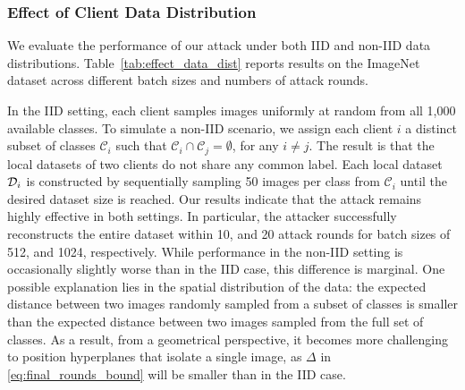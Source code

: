 \subsubsection{Effect of Client Data Distribution}
We evaluate the performance of our attack under both IID and non-IID data distributions. Table~\ref{tab:effect_data_dist} reports results on the ImageNet dataset across different batch sizes and numbers of attack rounds.

In the IID setting, each client samples images uniformly at random from all 1,000 available classes. To simulate a non-IID scenario, we assign each client $i$ a distinct subset of classes $\mathcal{C}_i$ such that $\mathcal{C}_i\cap \mathcal{C}_j = \emptyset$, for any $i\not=j$. The result is that the local datasets of two clients do not share any common label. Each local dataset $\mathcal{D}_i$ is constructed by sequentially sampling 50 images per class from $\mathcal{C}_i$ until the desired dataset size is reached.
Our results indicate that the attack remains highly effective in both settings. In particular, the attacker successfully reconstructs the entire dataset within 10, and 20 attack rounds for batch sizes of 512, and 1024, respectively. While performance in the non-IID setting is occasionally slightly worse than in the IID case, this difference is marginal. One possible explanation lies in the spatial distribution of the data: the expected distance between two images randomly sampled from a subset of classes is smaller than the expected distance between two images sampled from the full set of classes. As a result, from a geometrical perspective, it becomes more challenging to position hyperplanes that isolate a single image, as $\Delta$ in \eqref{eq:final_rounds_bound} will be smaller than in the IID case.
